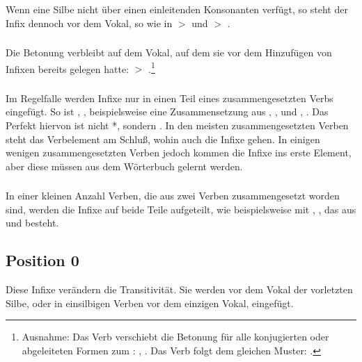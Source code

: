 \subsubsection{} Wenn eine Silbe nicht \"uber einen einleitenden Konsonanten
verf\"ugt, so steht der Infix dennoch vor dem Vokal, so wie in  $>$
 und  $>$ .

\subsubsection{} Die Betonung verbleibt auf dem Vokal, auf dem sie vor dem
Hinzuf\"ugen von Infixen bereits gelegen hatte:  $>$
.\footnote{Ausnahme: Das Verb  verschiebt
die Betonung f\"ur alle konjugierten oder abgeleiteten Formen zum :
, .
Das Verb  folgt dem gleichen Muster: .
}

\subsubsection{} Im Regelfalle werden Infixe nur in einen Teil eines zusammengesetzten
Verbs eingef\"ugt. So ist , , beispielsweise eine
Zusammensetzung aus , , und , . Das Perfekt
hiervon ist nicht *, sondern .
In den meisten zusammengesetzten Verben steht das Verbelement am Schlu\ss{}, wohin
auch die Infixe gehen. In einigen wenigen zusammengesetzten Verben jedoch kommen die
Infixe ins erste Element, aber diese m\"ussen aus dem W\"orterbuch gelernt werden.

\subsubsection{} In einer kleinen Anzahl Verben, die aus zwei Verben zusammengesetzt
worden sind, werden die Infixe auf beide Teile aufgeteilt, wie beispielsweise mit
, , das aus   und
  besteht.

\subsection{Position 0} Diese Infixe ver\"andern die Transitivit\"at. Sie werden vor
dem Vokal der vorletzten Silbe, oder in einsilbigen Verben vor dem einzigen Vokal, eingef\"ugt.
\label{morph:pre-first}

